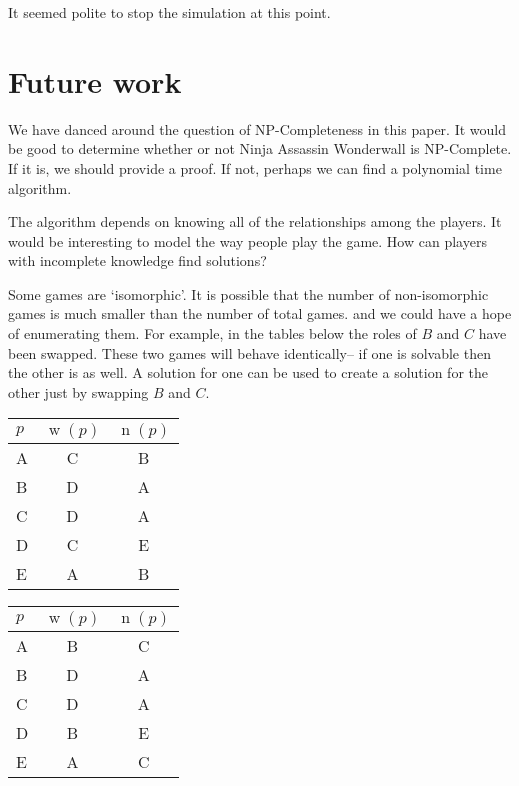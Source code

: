 \documentclass[12pt]{article}
\DeclareMathOperator{\w}{w}
\DeclareMathOperator{\n}{n}
\begin{document}
    It seemed polite to stop the simulation at this point.

\section{Future work}
    We have danced around the question of NP-Completeness in this paper. It would be good to determine whether or not Ninja Assassin Wonderwall is NP-Complete. If it is, we should provide a proof. If not, perhaps we can find a polynomial time algorithm.

    The algorithm depends on knowing all of the relationships among the players. It would be interesting to model the way people play the game. How can players with incomplete knowledge find solutions?

    Some games are `isomorphic'. It is possible that the number of non-isomorphic games is much smaller than the number of total games. and we could have a hope of enumerating them. For example, in the tables below the roles of $B$ and $C$ have been swapped. These two games will behave identically-- if one is solvable then the other is as well. A solution for one can be used to create a solution for the other just by swapping $B$ and $C$.

    \begin{multicols}{2}
        \begin{tabular}{l | c | c}
             $p$ & $\w(p)$ & $\n(p)$ \\
             \hline
             A &  C& B\\
             B &  D& A\\
             C &  D& A\\
             D &  C& E\\
             E &  A& B\\
        \end{tabular}


        \columnbreak
        \begin{tabular}{l | c | c}
             $p$ & $\w(p)$ & $\n(p)$ \\
             \hline
             A &  B& C\\
             B &  D& A\\
             C &  D& A\\
             D &  B& E\\
             E &  A& C\\
        \end{tabular}
    \end{multicols}
\end{document}
